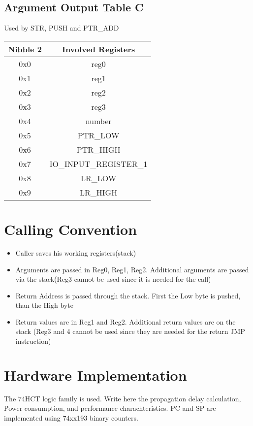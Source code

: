 \documentclass[a4paper, 12pt]{article}
\begin{document}
	\subsection{Argument Output Table C}
	Used by STR, PUSH and PTR\_ADD
	\begin{center}
		\begin{tabular}{|c|c|}
			\hline
			Nibble 2 & Involved Registers \\ \hline
			0x0 & reg0 \\ \hline
			0x1 & reg1 \\ \hline
			0x2 & reg2 \\ \hline
			0x3 & reg3 \\ \hline
			0x4 & number \\ \hline
			0x5 & PTR\_LOW \\ \hline
			0x6 & PTR\_HIGH \\ \hline
			0x7 & IO\_INPUT\_REGISTER\_1 \\ \hline
			0x8 & LR\_LOW \\ \hline
			0x9 & LR\_HIGH \\ \hline
		\end{tabular}
	\end{center}
	\section{Calling Convention}
	\begin{itemize}
		\item Caller saves his working registers(stack)
		\item Arguments are passed in Reg0, Reg1, Reg2. Additional arguments are passed via the stack(Reg3 cannot be used since it is needed for the call)
		\item Return Address is passed through the stack. First the Low byte is pushed, than the High byte
		\item Return values are in Reg1 and Reg2. Additional return values are on the stack (Reg3 and 4 cannot be used since they are needed for the return JMP instruction)
	\end{itemize}
	\section{Hardware Implementation}
	The 74HCT logic family is used.  Write here the propagation delay calculation, Power consumption, and performance charachteristics.
	PC and SP are implemented using 74xx193 binary counters.
\end{document}
